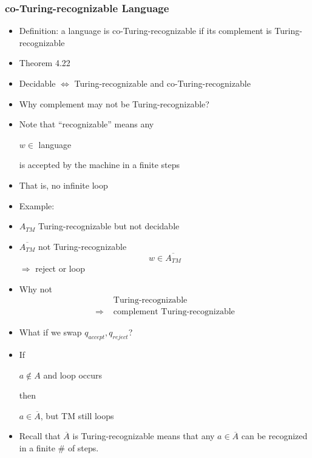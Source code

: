 \begin{frame}[allowframebreaks]
\begin{itemize}
\end{itemize}\end{frame} \begin{frame}[allowframebreaks] \frametitle{co-Turing-recognizable Language}
  \begin{itemize}
\item Definition: a language is co-Turing-recognizable
if its complement is Turing-recognizable
\item Theorem 4.22
\item[] Decidable $\Leftrightarrow$
Turing-recognizable and co-Turing-recognizable
\item Why complement may not be Turing-recognizable?
\item [] Note that ``recognizable'' means any
  \begin{center}
  $w \in $ language
\end{center}
is accepted by the machine in \alert{a finite steps}
\item That is, no infinite loop
\item Example:
\item [] $A_{TM}$ Turing-recognizable but not decidable

\item [] $\overline{A_{TM}}$ not Turing-recognizable
  \begin{equation*}
    w \in \overline{A_{TM}}
  \end{equation*}
  $\Rightarrow$ reject or loop


\item Why not
  \begin{equation*}
    \begin{split}
&   \text{ Turing-recognizable} \\
\Rightarrow & \text{ complement Turing-recognizable}
\end{split}
\end{equation*}
\item What if we swap $q_{accept},q_{reject}$?

\item If
  \begin{center}
  $a \notin A$ and loop occurs
\end{center}
then
\begin{center}
$a \in \overline{A}$, but TM still loops
\end{center}
\item Recall that $\overline{A}$ is Turing-recognizable means
that any
$a \in \overline{A}$ can be recognized in a finite \#
of steps.


\end{itemize}
\end{frame}
